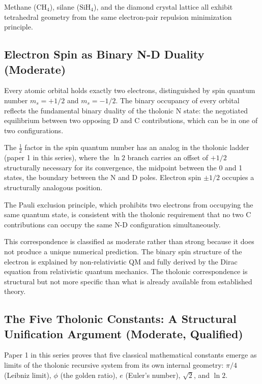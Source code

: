 \documentclass[12pt]{article}
\begin{document}
Methane ($\mathrm{CH_4}$), silane ($\mathrm{SiH_4}$), and the diamond crystal lattice all
exhibit tetrahedral geometry from the same electron-pair repulsion
minimization principle.

\subsection{Electron Spin as Binary N-D Duality (Moderate)}\label{electron-spin-as-binary-n-d-duality-moderate}

Every atomic orbital holds exactly two electrons, distinguished by spin
quantum number \(m_s = +1/2\) and \(m_s = -1/2\). The binary occupancy
of every orbital reflects the fundamental binary duality of the tholonic
N state: the negotiated equilibrium between two opposing D and C
contributions, which can be in one of two configurations.

The \(\tfrac{1}{2}\) factor in the spin quantum number has an analog in
the tholonic ladder (paper 1 in this series), where the \(\ln 2\) branch
carries an offset of \(+1/2\) structurally necessary for its
convergence, the midpoint between the 0 and 1 states, the boundary
between the N and D poles. Electron spin \(\pm 1/2\) occupies a
structurally analogous position.

The Pauli exclusion principle, which prohibits two electrons from
occupying the same quantum state, is consistent with the tholonic
requirement that no two C contributions can occupy the same N-D
configuration simultaneously.

This correspondence is classified as moderate rather than strong because
it does not produce a unique numerical prediction. The binary spin
structure of the electron is explained by non-relativistic QM and fully
derived by the Dirac equation from relativistic quantum mechanics. The
tholonic correspondence is structural but not more specific than what is
already available from established theory.

\subsection{The Five Tholonic Constants: A Structural Unification Argument (Moderate, Qualified)}\label{the-five-tholonic-constants-a-structural-unification-argument-moderate-qualified}

Paper 1 in this series proves that five classical mathematical constants
emerge as limits of the tholonic recursive system from its own internal
geometry: \(\pi/4\) (Leibniz limit), \(\phi\) (the golden ratio), \(e\)
(Euler's number), \(\sqrt{2}\), and \(\ln 2\).
\end{document}
